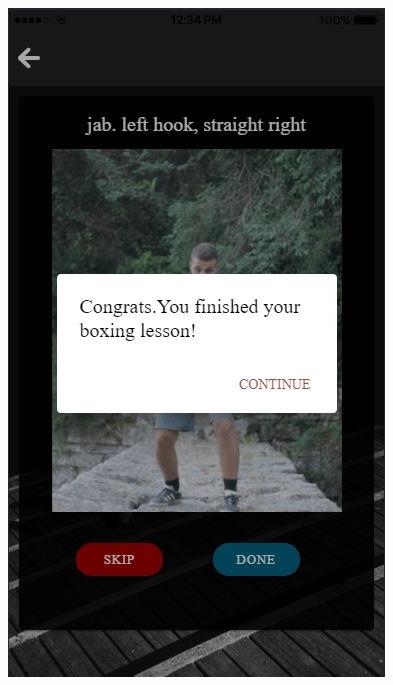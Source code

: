 \documentclass[a4paper,12pt]{article}
\begin{document}
\begin{figure}[!htb]
				\endminipage\hfill
				  \includegraphics[width=\linewidth]{lesson3}
				\endminipage\hfill

\end{figure}
\end{document}

